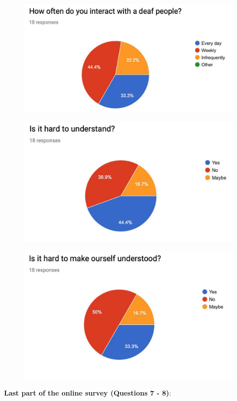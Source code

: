 \begin{figure}[h]
	\centering
	\includegraphics[width=0.7\linewidth]{"Figure/photo_2019-02-06_15-58-49 (2)"}
	\label{fig:photo2019-02-0615-58-49-2}
\end{figure}
\begin{figure}[h]
	\centering
	\includegraphics[width=0.7\linewidth]{"Figure/photo_2019-02-06_15-58-50 (2)"}
	\label{fig:photo2019-02-0615-58-50-2}
\end{figure}
\begin{figure}[h]
	\centering
	\includegraphics[width=0.7\linewidth]{"Figure/photo_2019-02-06_15-58-50 (3)"}
	\label{fig:photo2019-02-0615-58-50-3}
\end{figure}
\clearpage
\textbf{Last part of the online survey (Questions 7 - 8)}:

